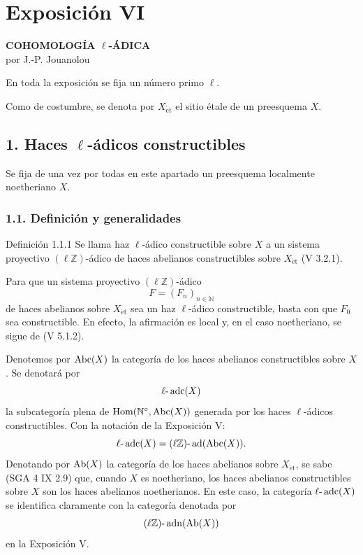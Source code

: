 \section*{Exposición VI}

\begin{center}
\textbf{COHOMOLOGÍA \(\ell\)-ÁDICA}\\[0.5em]
por J.-P. Jouanolou
\end{center}

En toda la exposición se fija un número primo \(\ell\).

Como de costumbre, se denota por \(X_{\mathrm{\acute et}}\) el sitio étale de un preesquema \(X\).

\subsection*{1. Haces \(\ell\)-ádicos constructibles}

Se fija de una vez por todas en este apartado un preesquema localmente noetheriano \(X\).

\subsubsection*{1.1. Definición y generalidades}

\begin{statement}{Definición 1.1.1}
Se llama haz \(\ell\)-ádico constructible sobre \(X\) a un sistema proyectivo \((\ell\mathbb Z)\)-ádico de haces abelianos constructibles sobre \(X_{\mathrm{\acute et}}\) (V 3.2.1).
\end{statement}

Para que un sistema proyectivo \((\ell\mathbb Z)\)-ádico
\[
F=(F_n)_{n\in\mathbb N}
\]
de haces abelianos sobre \(X_{\mathrm{\acute et}}\) sea un haz \(\ell\)-ádico constructible, basta con que \(F_0\) sea constructible. En efecto, la afirmación es local y, en el caso noetheriano, se sigue de (V 5.1.2).

Denotemos por \(\operatorname{Abc}(X)\) la categoría de los haces abelianos constructibles sobre \(X\). Se denotará por
\[
\ell\text{-}\operatorname{adc}(X)
\]
la subcategoría plena de \(\operatorname{Hom}(\mathbb N^{\circ},\operatorname{Abc}(X))\) generada por los haces \(\ell\)-ádicos constructibles. Con la notación de la Exposición V:
\[
\ell\text{-}\operatorname{adc}(X)=(\ell\mathbb Z)\text{-}\operatorname{ad}(\operatorname{Abc}(X)).
\]
Denotando por \(\operatorname{Ab}(X)\) la categoría de los haces abelianos sobre \(X_{\mathrm{\acute et}}\), se sabe (SGA 4 IX 2.9) que, cuando \(X\) es noetheriano, los haces abelianos constructibles sobre \(X\) son los haces abelianos noetherianos. En este caso, la categoría \(\ell\text{-}\operatorname{adc}(X)\) se identifica claramente con la categoría denotada por
\[
(\ell\mathbb Z)\text{-}\operatorname{adn}(\operatorname{Ab}(X))
\]
en la Exposición V.

